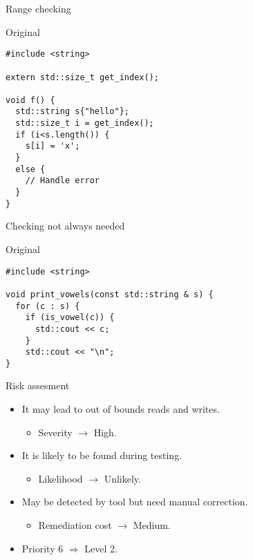 \begin{frame}[t,fragile]{Range checking}
\begin{block}{Original}
\begin{lstlisting}
#include <string>

extern std::size_t get_index();

void f() {
  std::string s{"hello"};
  std::size_t i = get_index();
  if (i<s.length()) {
    s[i] = 'x';
  }
  else {
    // Handle error
  }
}
\end{lstlisting}
\end{block}
\end{frame}

\begin{frame}[t,fragile]{Checking not always needed}
\begin{block}{Original}
\begin{lstlisting}
#include <string>

void print_vowels(const std::string & s) {
  for (c : s) {
    if (is_vowel(c)) {
      std::cout << c;
    }
    std::cout << "\n";
}
\end{lstlisting}
\end{block}
\end{frame}

\begin{frame}[t]{Risk assesment}
\begin{itemize}
  \item It may lead to out of bounds reads and writes.
    \begin{itemize}
      \item Severity $\rightarrow$ High.
    \end{itemize}

  \vfill
  \item It is likely to be found during testing.
    \begin{itemize}
      \item Likelihood $\rightarrow$ Unlikely.
    \end{itemize}

  \vfill
  \item May be detected by tool but need manual correction.
    \begin{itemize}
      \item Remediation cost $\rightarrow$ Medium.
    \end{itemize}

  \vfill
  \item Priority 6 $\Rightarrow$ Level 2.
\end{itemize}
\end{frame}
